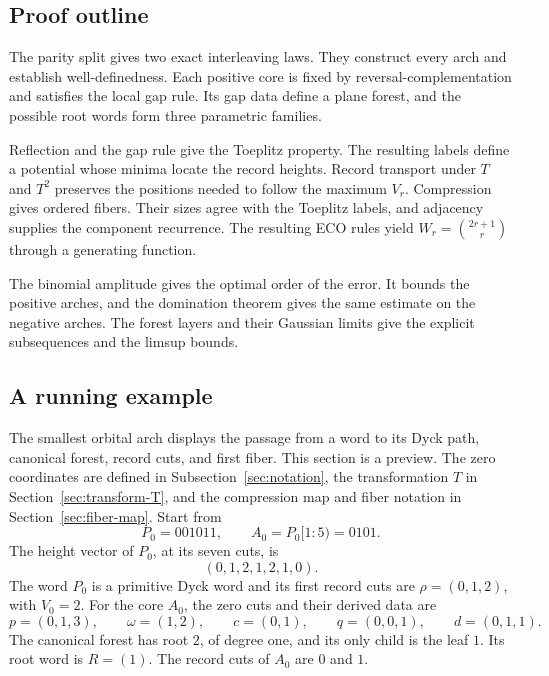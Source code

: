 \documentclass[11pt]{article}
\theoremstyle{definition}
\theoremstyle{remark}
\begin{document}
\subsection{Proof outline}

The parity split gives two exact interleaving laws.  They construct every arch
and establish well-definedness.  Each positive core is fixed by
reversal-complementation and satisfies the local gap rule.  Its gap data
define a plane forest, and the possible root words form three parametric
families.

Reflection and the gap rule give the Toeplitz property.  The resulting labels
define a potential whose minima locate the record heights.  Record transport
under \(T\) and \(T^2\) preserves the positions needed to follow the maximum
\(V_r\).  Compression gives ordered fibers.  Their sizes agree with the
Toeplitz labels, and adjacency supplies the component recurrence.  The
resulting ECO rules yield
\(W_r=\binom{2r+1}{r}\) through a generating function.

The binomial amplitude gives the optimal order of the error.  It bounds the
positive arches, and the domination theorem gives the same estimate on the
negative arches.  The forest layers and their Gaussian limits give the
explicit subsequences and the limsup bounds.

\subsection{A running example}

The smallest orbital arch displays the passage from a word to its Dyck path,
canonical forest, record cuts, and first fiber.  This section is a preview.
The zero coordinates are defined in Subsection~\ref{sec:notation}, the transformation \(T\)
in Section~\ref{sec:transform-T}, and the compression map and fiber notation
in Section~\ref{sec:fiber-map}.  Start from
\[
 P_0=001011,
 \qquad A_0=P_0[1:5)=0101.
\]
The height vector of \(P_0\), at its seven cuts, is
\[
 (0,1,2,1,2,1,0).
\]
The word \(P_0\) is a primitive Dyck word and its first record cuts are
\(\rho=(0,1,2)\), with \(V_0=2\).  For the core \(A_0\), the zero cuts and
their derived data are
\[
 p=(0,1,3),\qquad \omega=(1,2),\qquad c=(0,1),
 \qquad q=(0,0,1),\qquad d=(0,1,1).
\]
The canonical forest has root \(2\), of degree one, and its only
child is the leaf \(1\).  Its root word is \(R=(1)\).  The record cuts of
\(A_0\) are \(0\) and \(1\).
\end{document}
